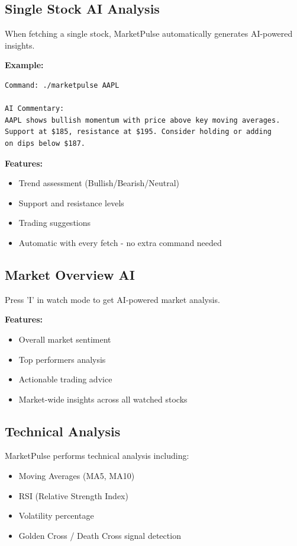 \documentclass[12pt,a4paper]{article}
\begin{document}
\subsection{Single Stock AI Analysis}

When fetching a single stock, MarketPulse automatically generates AI-powered insights.

\textbf{Example:}
\begin{lstlisting}
Command: ./marketpulse AAPL

AI Commentary:
AAPL shows bullish momentum with price above key moving averages.
Support at $185, resistance at $195. Consider holding or adding
on dips below $187.
\end{lstlisting}

\textbf{Features:}
\begin{itemize}[itemsep=0.3em]
    \item Trend assessment (Bullish/Bearish/Neutral)
    \item Support and resistance levels
    \item Trading suggestions
    \item Automatic with every fetch - no extra command needed
\end{itemize}

\subsection{Market Overview AI}

Press 'I' in watch mode to get AI-powered market analysis.

\textbf{Features:}
\begin{itemize}[itemsep=0.3em]
    \item Overall market sentiment
    \item Top performers analysis
    \item Actionable trading advice
    \item Market-wide insights across all watched stocks
\end{itemize}

\subsection{Technical Analysis}

MarketPulse performs technical analysis including:
\begin{itemize}[itemsep=0.3em]
    \item Moving Averages (MA5, MA10)
    \item RSI (Relative Strength Index)
    \item Volatility percentage
    \item Golden Cross / Death Cross signal detection
\end{itemize}
\end{document}

